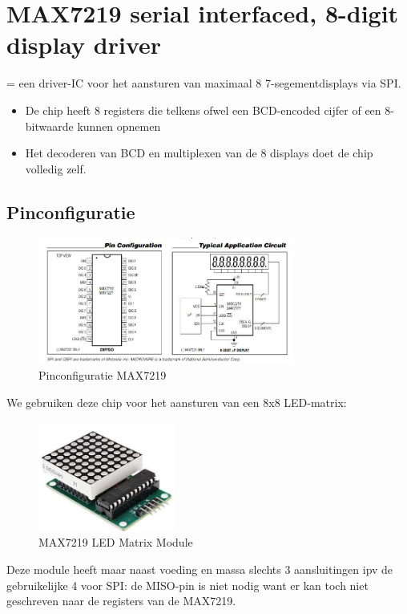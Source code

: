 \documentclass{article}
\begin{document}
\section{MAX7219 serial interfaced, 8-digit display driver}
= een driver-IC voor het aansturen van maximaal 8 7-segementdisplays via SPI. 

\begin{itemize}
    \item De chip heeft 8 registers die telkens ofwel een BCD-encoded cijfer of een 8-bitwaarde kunnen opnemen
    \item Het decoderen van BCD en multiplexen van de 8 displays doet de chip volledig zelf.
\end{itemize}

\subsection{Pinconfiguratie}
\begin{figure}[H]
    \centering
    \includegraphics[width=0.75\textwidth]{max7219-pins.png}
    \caption{Pinconfiguratie MAX7219}
\end{figure}

We gebruiken deze chip voor het aansturen van een 8x8 LED-matrix:

\begin{figure}[H]
    \centering
    \includegraphics[width=0.4\textwidth]{matrix.png}
    \caption{MAX7219 LED Matrix Module}
\end{figure}

Deze module heeft maar naast voeding en massa slechts 3 aansluitingen ipv de gebruikelijke 4 voor SPI:
de MISO-pin is niet nodig want er kan toch niet geschreven naar de registers van de MAX7219.
\end{document}
